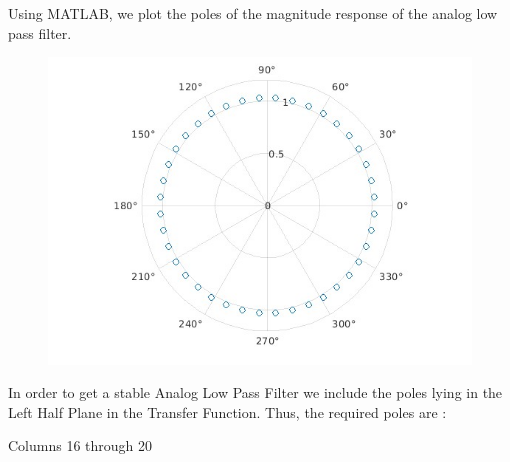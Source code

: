 \documentclass{article}
\begin{document}
Using MATLAB, we plot the poles of the magnitude response of the analog low pass filter.
\begin{figure}[h!]
    \centering
    \includegraphics[scale = 0.5]{poles_bpf.jpg}
    \caption{}
    \label{fig:my_label}
\end{figure}
In order to get a stable Analog Low Pass Filter we include the poles lying in the Left Half Plane in the Transfer Function. Thus, the required poles are :
        


  Columns 16 through 20

  

  
\end{document}
